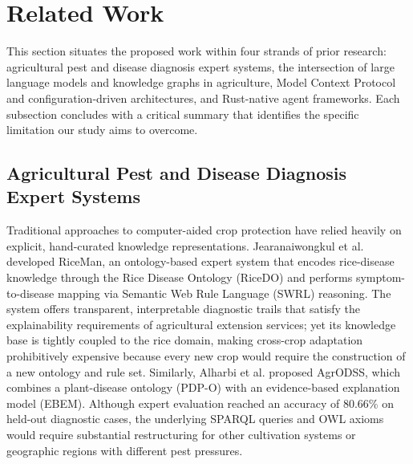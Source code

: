 \section{Related Work}
\label{sec:related-work}

This section situates the proposed work within four strands of prior research: agricultural pest and disease diagnosis expert systems, the intersection of large language models and knowledge graphs in agriculture, Model Context Protocol and configuration-driven architectures, and Rust-native agent frameworks. Each subsection concludes with a critical summary that identifies the specific limitation our study aims to overcome.

\subsection{Agricultural Pest and Disease Diagnosis Expert Systems}

Traditional approaches to computer-aided crop protection have relied heavily on explicit, hand-curated knowledge representations. Jearanaiwongkul et al. \cite{jearanaiwongkul2021riceman} developed RiceMan, an ontology-based expert system that encodes rice-disease knowledge through the Rice Disease Ontology (RiceDO) and performs symptom-to-disease mapping via Semantic Web Rule Language (SWRL) reasoning. The system offers transparent, interpretable diagnostic trails that satisfy the explainability requirements of agricultural extension services; yet its knowledge base is tightly coupled to the rice domain, making cross-crop adaptation prohibitively expensive because every new crop would require the construction of a new ontology and rule set. Similarly, Alharbi et al. \cite{alharbi2024agrodss} proposed AgrODSS, which combines a plant-disease ontology (PDP-O) with an evidence-based explanation model (EBEM). Although expert evaluation reached an accuracy of 80.66\% on held-out diagnostic cases, the underlying SPARQL queries and OWL axioms would require substantial restructuring for other cultivation systems or geographic regions with different pest pressures.

